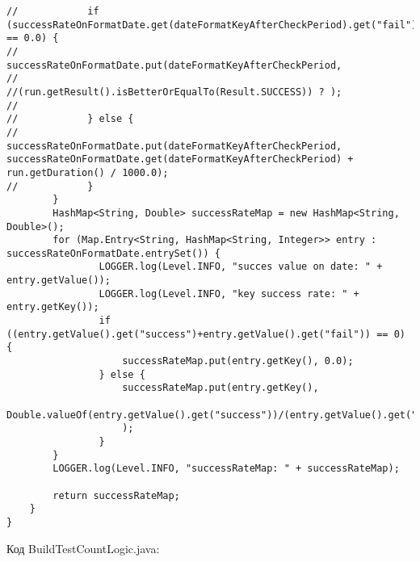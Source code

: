 \begin{lstlisting}
//            if (successRateOnFormatDate.get(dateFormatKeyAfterCheckPeriod).get("fail") == 0.0) {
//                successRateOnFormatDate.put(dateFormatKeyAfterCheckPeriod,
//                        //(run.getResult().isBetterOrEqualTo(Result.SUCCESS)) ? );
//
//            } else {
//                successRateOnFormatDate.put(dateFormatKeyAfterCheckPeriod, successRateOnFormatDate.get(dateFormatKeyAfterCheckPeriod) + run.getDuration() / 1000.0);
//            }
        }
        HashMap<String, Double> successRateMap = new HashMap<String, Double>();
        for (Map.Entry<String, HashMap<String, Integer>> entry : successRateOnFormatDate.entrySet()) {
                LOGGER.log(Level.INFO, "succes value on date: " + entry.getValue());
                LOGGER.log(Level.INFO, "key success rate: " + entry.getKey());
                if ((entry.getValue().get("success")+entry.getValue().get("fail")) == 0) {
                    successRateMap.put(entry.getKey(), 0.0);
                } else {
                    successRateMap.put(entry.getKey(),
                            Double.valueOf(entry.getValue().get("success"))/(entry.getValue().get("success")+entry.getValue().get("fail"))
                    );
                }
        }
        LOGGER.log(Level.INFO, "successRateMap: " + successRateMap);

        return successRateMap;
    }
}

\end{lstlisting}

Код BuildTestCountLogic.java:

